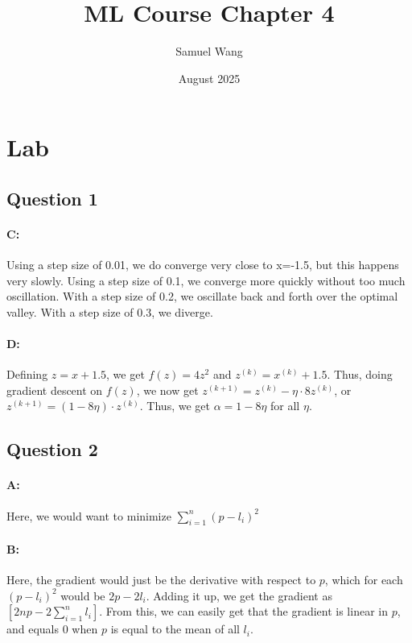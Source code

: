 \documentclass{article}
\title{ML Course Chapter 4}
\author{Samuel Wang}
\date{August 2025}
\begin{document}
\maketitle

\section{Lab}

\subsection{Question 1}

\paragraph{C: } Using a step size of 0.01, we do converge very close to x=-1.5, but this happens very slowly. \newline
Using a step size of 0.1, we converge more quickly without too much oscillation. \newline
With a step size of 0.2, we oscillate back and forth over the optimal valley. \newline
With a step size of 0.3, we diverge.

\paragraph{D: } Defining $z=x+1.5$, we get $f(z)=4z^2$ and $z^{(k)}=x^{(k)}+1.5$. Thus, doing gradient descent on $f(z)$, we now get $z^{(k+1)}=z^{(k)}-\eta \cdot 8z^{(k)}$, or $z^{(k+1)}=(1-8\eta)\cdot z^{(k)}$. Thus, we get $\alpha = 1-8\eta$ for all $\eta$.

\subsection{Question 2}

\paragraph{A: } Here, we would want to minimize $\sum_{i=1}^n (p-l_i)^2$

\paragraph{B: } Here, the gradient would just be the derivative with respect to $p$, which for each $(p-l_i)^2$ would be $2p-2l_i$. Adding it up, we get the gradient as $[2np-2\sum_{i=1}^n l_i]$. From this, we can easily get that the gradient is linear in $p$, and equals $0$ when $p$ is equal to the mean of all $l_i$.
\end{document}

